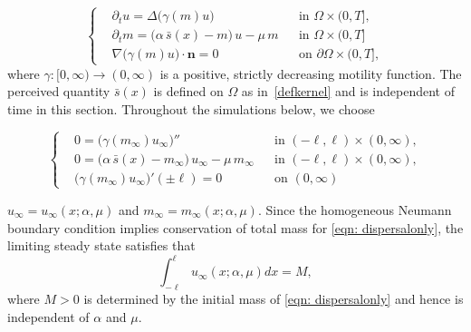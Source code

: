 \documentclass[10pt,a4paper]{amsart}
\begin{document}
\begin{equation}\label{eqn: dispersalonly}
\left\{
\begin{aligned}
&\partial_t u  = \Delta\big(\gamma(m) u\big)
&& \text{in } \Omega\times(0,T], \\[4pt]
&\partial_t m = \big(\alpha\,\bar s(x)-m\big)\,u - \mu\,m
&& \text{in } \Omega\times(0,T]\\
&\nabla \big(\gamma(m) u\big)\cdot \mathbf{n} = 0
&& \text{on } \partial\Omega\times(0,T],
\end{aligned}
\right.
\end{equation} where \(\gamma:[0,\infty)\to(0,\infty)\) is a positive, strictly decreasing motility function. The perceived quantity \(\bar s(x)\) is defined on \(\Omega\) as in~\eqref{defkernel} and is independent of time in this section. Throughout the simulations below, we choose

\begin{equation}\label{eqn: SS dispersal}
\left\{
\begin{aligned}
&0  = \big(\gamma(m_\infty) u_\infty\big)''
&& \text{in } (-\ell,\ell)\times(0,\infty), \\[4pt]
&0 = \big(\alpha\,\bar s(x)-m_\infty\big)\,u_\infty - \mu\,m_\infty
&& \text{in } (-\ell,\ell)\times(0,\infty),\\
&\big(\gamma(m_\infty) u_\infty\big)'(\pm\ell) = 0
&& \text{on } (0,\infty)
\end{aligned}
\right.
\end{equation}

$u_\infty=u_\infty(x;\alpha,\mu)$ and $m_\infty=m_\infty(x;\alpha,\mu)$. Since the homogeneous Neumann boundary condition implies conservation of total mass for \eqref{eqn: dispersalonly}, the limiting steady state satisfies that \begin{equation}
    \label{mass conservation}
    \int_{-\ell}^\ell u_\infty(x;\alpha,\mu) dx = M,
\end{equation} where $M>0$ is determined by the initial mass of \eqref{eqn: dispersalonly} and hence is independent of $\alpha$ and $\mu$.
\end{document}
